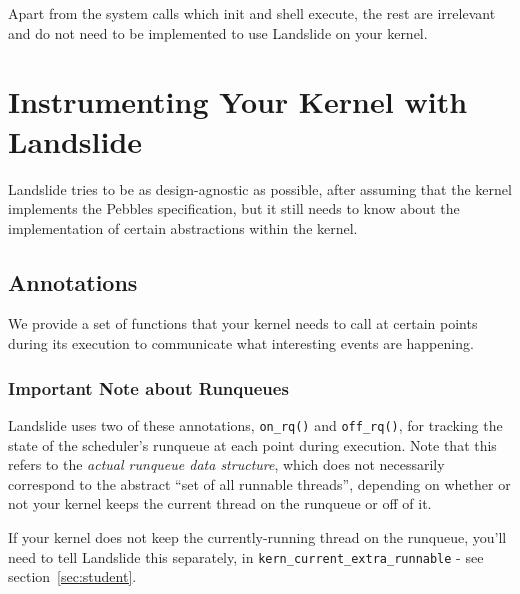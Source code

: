 \documentclass{article}
\begin{document}
Apart from the system calls which init and shell execute, the rest are irrelevant and do not need to be implemented to use Landslide on your kernel.

\section{Instrumenting Your Kernel with Landslide}
\label{sec:hooks}

Landslide tries to be as design-agnostic as possible, after assuming that the kernel implements the Pebbles specification, but it still needs to know about the implementation of certain abstractions within the kernel.

\subsection{Annotations}
\label{sec:tell}

We provide a set of functions that your kernel needs to call at certain points during its execution to communicate what interesting events are happening.

\subsubsection{Important Note about Runqueues}
\label{sec:runqueue}
Landslide uses two of these annotations, \texttt{on\_rq()} and \texttt{off\_rq()}, for tracking the state of the scheduler's runqueue at each point during execution.
Note that this refers to the {\em actual runqueue data structure}, which does not necessarily correspond to the abstract ``set of all runnable threads'', depending on whether or not your kernel keeps the current thread on the runqueue or off of it.

If your kernel does not keep the currently-running thread on the runqueue, you'll need to tell Landslide this separately, in \texttt{kern\_current\_extra\_runnable} - see section~\ref{sec:student}.
\end{document}
